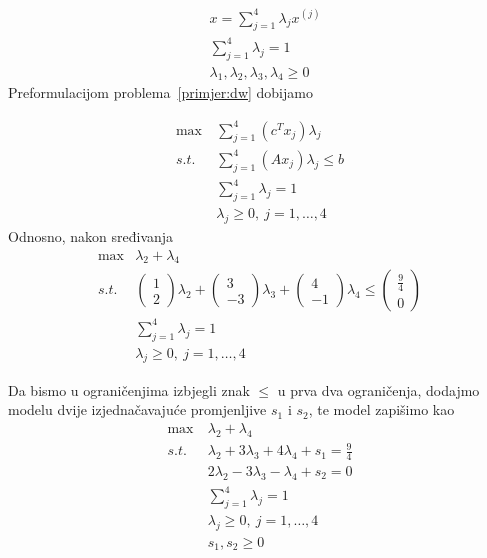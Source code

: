 \documentclass[a4paper, utf8, 11pt, colorlinks]{book}
\begin{document}
$$\begin{aligned}
&x = \sum_{j=1}^4\lambda_j x^{(j)}\\
&\sum_{j=1}^4\lambda_j=1\\
&\lambda_1,\lambda_2,\lambda_3,\lambda_4\geqslant 0
\end{aligned}$$
 Preformulacijom problema~\ref{primjer:dw} dobijamo
 
     \begin{equation}
 	\begin{aligned}\label{primjer:dw3}
 		\max\  & \sum_{j=1}^4(c^T x_j)\lambda_j\\
 		s.t.\  &\sum_{j=1}^4 (A x_j)\lambda_j\leqslant b\\
 		&\sum_{j=1}^4\lambda_j = 1\\
 		&\lambda_j\geqslant 0,\ j = 1,\ldots,4
 	\end{aligned}
 \end{equation}
 Odnosno, nakon sređivanja 
      \begin{equation}
 	\begin{aligned}\label{primjer:dw4}
 		\max  & \lambda_2+\lambda_4\\
 		s.t.\  &\left(\begin{array}{c}
 			1\\
 			2
 		\end{array}\right)\lambda_2+\left(\begin{array}{c}
 		3\\
 		-3
 	\end{array}\right)\lambda_3+\left(\begin{array}{c}
 	4\\
 	-1
 \end{array}\right)\lambda_4\leqslant \left(\begin{array}{c}
 			\frac 9 4\\
 			0
 		\end{array}\right)\\
 		&\sum_{j=1}^4\lambda_j = 1\\
 		&\lambda_j\geqslant 0,\ j = 1,\ldots,4
 	\end{aligned}
 \end{equation}

Da bismo u ograničenjima izbjegli znak $\leqslant$ u prva dva ograničenja, dodajmo modelu dvije izjednačavajuće promjenljive $s_1$ i $s_2$, te model zapišimo kao
      \begin{equation}
	\begin{aligned}\label{primjer:dw5}
		\max\  & \lambda_2+\lambda_4\\
		s.t.\  &\lambda_2+3\lambda_3+4\lambda_4+s_1=\frac 94\\
		&2\lambda_2-3\lambda_3-\lambda_4+s_2=0\\
		&\sum_{j=1}^4\lambda_j = 1\\
		&\lambda_j\geqslant 0,\ j = 1,\ldots,4\\
		&s_1,s_2\geqslant 0
	\end{aligned}
\end{equation}
\end{document}
